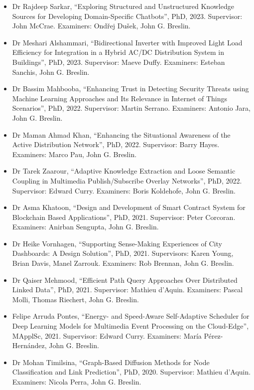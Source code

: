 \documentclass[10pt,a4paper]{res} %
\begin{document}
\begin{resume}
\begin{itemize} \itemsep -2pt
\item Dr Rajdeep Sarkar, ``Exploring Structured and Unstructured Knowledge Sources for Developing Domain-Specific Chatbots'', PhD, 2023. Supervisor: John McCrae. Examiners: Ond\v{r}ej Du\v{s}ek, John G. Breslin. %
\item Dr Meshari Alshammari, ``Bidirectional Inverter with Improved Light Load Efficiency for Integration in a Hybrid AC/DC Distribution System in Buildings'', PhD, 2023. Supervisor: Maeve Duffy. Examiners: Esteban Sanchis, John G. Breslin. %
\item Dr Bassim Mahbooba, ``Enhancing Trust in Detecting Security Threats using Machine Learning Approaches and Its Relevance in Internet of Things Scenarios'', PhD, 2022. Supervisor: Martin Serrano. Examiners: Antonio Jara, John G. Breslin. %
\item Dr Maman Ahmad Khan, ``Enhancing the Situational Awareness of the Active Distribution Network'', PhD, 2022. Supervisor: Barry Hayes. Examiners: Marco Pau, John G. Breslin. %
\item Dr Tarek Zaarour, ``Adaptive Knowledge Extraction and Loose Semantic Coupling in Multimedia Publish/Subscribe Overlay Networks'', PhD, 2022. Supervisor: Edward Curry. Examiners: Boris Koldehofe, John G. Breslin. %
\item Dr Asma Khatoon, ``Design and Development of Smart Contract System for Blockchain Based Applications'', PhD, 2021. Supervisor: Peter Corcoran. Examiners: Anirban Sengupta, John G. Breslin. %
\item Dr Heike Vornhagen, ``Supporting Sense-Making Experiences of City Dashboards: A Design Solution'', PhD, 2021. Supervisors: Karen Young, Brian Davis, Manel Zarrouk. Examiners: Rob Brennan, John G. Breslin. %
\item Dr Qaiser Mehmood, ``Efficient Path Query Approaches Over Distributed Linked Data'', PhD, 2021. Supervisor: Mathieu d'Aquin. Examiners: Pascal Molli, Thomas Riechert, John G. Breslin.
\item Felipe Arruda Pontes, ``Energy- and Speed-Aware Self-Adaptive Scheduler for Deep Learning Models for Multimedia Event Processing on the Cloud-Edge'', MApplSc, 2021. Supervisor: Edward Curry. Examiners: Mar\'{i}a P\'{e}rez-Hern\'{a}ndez, John G. Breslin.
\item Dr Mohan Timilsina, ``Graph-Based Diffusion Methods for Node Classification and Link Prediction'', PhD, 2020. Supervisor: Mathieu d'Aquin. Examiners: Nicola Perra, John G. Breslin.

\end{itemize}
\end{resume}
\end{document}
